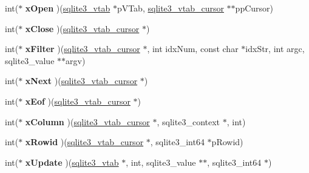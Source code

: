 \begin{DoxyCompactItemize}
int($\ast$ {\bfseries x\+Open} )(\hyperlink{structsqlite3__vtab}{sqlite3\+\_\+vtab} $\ast$p\+V\+Tab, \hyperlink{structsqlite3__vtab__cursor}{sqlite3\+\_\+vtab\+\_\+cursor} $\ast$$\ast$pp\+Cursor)
\item 
\mbox{\label{structsqlite3__module_a514c66634a5297ca9879947fa6f8f10f}} 
int($\ast$ {\bfseries x\+Close} )(\hyperlink{structsqlite3__vtab__cursor}{sqlite3\+\_\+vtab\+\_\+cursor} $\ast$)
\item 
\mbox{\label{structsqlite3__module_a1ddde32dcae461910096ebb2c42d1a6a}} 
int($\ast$ {\bfseries x\+Filter} )(\hyperlink{structsqlite3__vtab__cursor}{sqlite3\+\_\+vtab\+\_\+cursor} $\ast$, int idx\+Num, const char $\ast$idx\+Str, int argc, sqlite3\+\_\+value $\ast$$\ast$argv)
\item 
\mbox{\label{structsqlite3__module_aa739d9a2081db7bf786f1f9fb9d92264}} 
int($\ast$ {\bfseries x\+Next} )(\hyperlink{structsqlite3__vtab__cursor}{sqlite3\+\_\+vtab\+\_\+cursor} $\ast$)
\item 
\mbox{\label{structsqlite3__module_ae10cf7d9a7edfecf1daa34a214bf6a64}} 
int($\ast$ {\bfseries x\+Eof} )(\hyperlink{structsqlite3__vtab__cursor}{sqlite3\+\_\+vtab\+\_\+cursor} $\ast$)
\item 
\mbox{\label{structsqlite3__module_a4c82dc60335ba40c816cdd6c4dce2950}} 
int($\ast$ {\bfseries x\+Column} )(\hyperlink{structsqlite3__vtab__cursor}{sqlite3\+\_\+vtab\+\_\+cursor} $\ast$, sqlite3\+\_\+context $\ast$, int)
\item 
\mbox{\label{structsqlite3__module_a1e119b28bd3ad706d1982aaa938aac79}} 
int($\ast$ {\bfseries x\+Rowid} )(\hyperlink{structsqlite3__vtab__cursor}{sqlite3\+\_\+vtab\+\_\+cursor} $\ast$, sqlite3\+\_\+int64 $\ast$p\+Rowid)
\item 
\mbox{\label{structsqlite3__module_a029d0713dbb3c847a6de773a0a179605}} 
int($\ast$ {\bfseries x\+Update} )(\hyperlink{structsqlite3__vtab}{sqlite3\+\_\+vtab} $\ast$, int, sqlite3\+\_\+value $\ast$$\ast$, sqlite3\+\_\+int64 $\ast$)
\item 
\mbox{\label{structsqlite3__module_af3ea97df2b110da6ceb4797222e6d86f}} 
$$
\end{DoxyCompactItemize}
